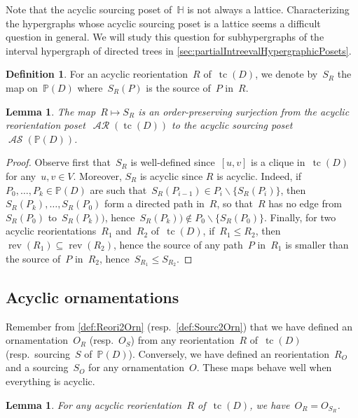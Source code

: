 \documentclass{amsart}
\newtheorem{lemma}[theorem]{Lemma}
\theoremstyle{definition}
\newtheorem{definition}[theorem]{Definition}
\renewcommand{\c}[1]{\mathcal{#1}} %
\newcommand{\ssm}{\smallsetminus} %
\DeclareMathOperator{\tc}{tc} %
\DeclareMathOperator{\AReori}{\c{AR}}  %
\DeclareMathOperator{\rev}{rev} %
\DeclareMathOperator{\ASour}{\mathcal{AS}}  %
\newcommand{\HH}{\mathbb H}  %
\newcommand{\PP}{\mathbb P} %
\begin{document}
Note that the acyclic sourcing poset of~$\HH$ is not always a lattice.
Characterizing the hypergraphs whose acyclic sourcing poset is a lattice seems a difficult question in general.
We will study this question for subhypergraphs of the interval hypergraph of directed trees in \cref{sec:partialIntreevalHypergraphicPosets}.

\begin{definition}
For an acyclic reorientation~$R$ of~$\tc(D)$, we denote by~$S_{\!R}$ the map on~$\PP(D)$ where~$S_{\!R}(P)$ is the source of~$P$ in~$R$.
\end{definition}

\begin{lemma}
The map~$R \mapsto S_{\!R}$ is an order-preserving surjection from the acyclic reorientation poset~$\AReori(\tc(D))$ to the acyclic sourcing poset~$\ASour(\PP(D))$.
\end{lemma}

\begin{proof}
Observe first that~$S_{\!R}$ is well-defined since~$[u,v]$ is a clique in~$\tc(D)$ for any~$u,v \in V$.
Moreover, $S_{\!R}$ is acyclic since $R$ is acyclic.
Indeed, if~$P_0, \dots, P_k \in \PP(D)$ are such that~$S_{\!R}(P_{i-1}) \in P_i \ssm \{S_{\!R}(P_i)\}$, then~$S_{\!R}(P_k), \dots, S_{\!R}(P_0)$ form a directed path in~$R$, so that~$R$ has no edge from~$S_{\!R}(P_0)$ to~$S_{\!R}(P_k))$, hence~$S_{\!R}(P_k)) \notin P_0 \ssm \{S_{\!R}(P_0)\}$.
Finally, for two acyclic reorientations~$R_1$ and~$R_2$ of~$\tc(D)$, if~$R_1 \le R_2$, then~$\rev(R_1) \subseteq \rev(R_2)$, hence the source of any path~$P$ in~$R_1$ is smaller than the source of~$P$ in~$R_2$, hence~$S_{\!R_1} \le S_{\!R_2}$.
\end{proof}

\subsection{Acyclic ornamentations}

Remember from \cref{def:Reori2Orn} (resp.~\cref{def:Sourc2Orn}) that we have defined an ornamentation~$O_{\!R}$ (resp.~$O_{\!S}$) from any reorientation~$R$ of~$\tc(D)$ (resp.~sourcing~$S$ of~$\PP(D)$).
Conversely, we have defined an reorientation~$R_O$ and a sourcing~$S_O$ for any ornamentation~$O$.
These maps behave well when everything is acyclic.

\begin{lemma}
For any acyclic reorientation~$R$ of~$\tc(D)$, we have~$O_{\!R} = O_{\!S_{\!R}}$.
\end{lemma}
\end{document}
